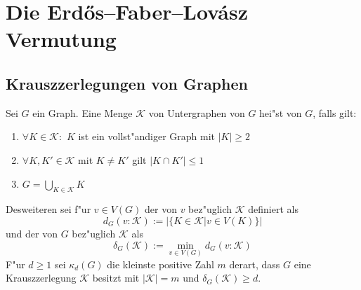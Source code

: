 \section{Die Erd\H{o}s--Faber--Lov\'asz Vermutung}
\label{sec:EFL-Vermutung}


\subsection{Krauszzerlegungen von Graphen}
\label{ssec:Krauszzerlegung}
\begin{definition}
    \label{def:Krauszzerlegung}
    Sei $G$ ein Graph. Eine Menge $\mathcal K$ von Untergraphen von $G$ hei"st  von $G$, falls gilt:
    \begin{enumerate}[label=(\roman*)]
        \item $\forall K \in \mathcal K:$ $K$ ist ein vollst"andiger Graph mit $|K| \geq 2$
        \item $\forall K, K'\in \mathcal K$ mit $K\neq K'$ gilt $|K\cap K'| \leq 1$
        \item $G=\bigcup\limits_{K\in \mathcal K}K$
    \end{enumerate}
    Desweiteren sei f"ur $v\in V(G)$ der  von $v$ bez"uglich $\mathcal K$ definiert als $$d_G(v:\mathcal K) := |\{ K\in\mathcal K| v \in V(K)\}|$$ und der  von $G$ bez"uglich $\mathcal K$ als $$\delta_G(\mathcal K) := \min\limits_{v\in V(G)}d_G(v:\mathcal K)$$ 
    F"ur $d \geq 1$ sei $\kappa_d(G)$ die kleinste positive Zahl $m$ derart, dass $G$ eine Krauszzerlegung $\mathcal K$ besitzt mit $|\mathcal K| = m$ und $\delta_G(\mathcal K) \geq d$.
\end{definition}
